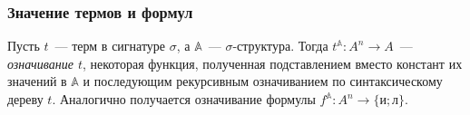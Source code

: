 \subsubsection{Значение термов и формул}

\begin{definition}
	Пусть $t$~— терм в сигнатуре $\sigma$, а $\mathbb{A}$~— $\sigma$-структура. Тогда $t^{\mathbb{A}}: A^n \to A$~— \emph{означивание $t$}, некоторая функция, полученная подставлением вместо констант их значений в $\mathbb{A}$ и последующим рекурсивным означиванием по синтаксическому дереву $t$. Аналогично получается означивание формулы $f^{\mathbb{A}}: A^n \to \{\text{и}; \text{л}\}$.
\end{definition}